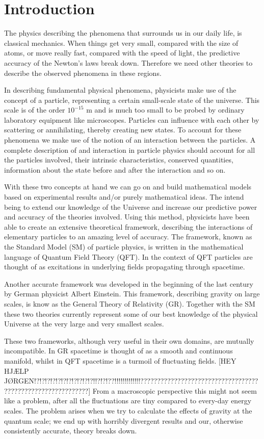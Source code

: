 \section{Introduction}
The physics describing the phenomena that surrounds us in our daily life, is classical mechanics. When things get very small, compared with the size of atoms, or move really fast, compared with the speed of light, the predictive accuracy of the Newton's laws break down. Therefore we need other theories to describe the observed phenomena in these regions.

In describing fundamental physical phenomena, physicists make use of the concept of a particle, representing a certain small-scale state of the universe. This scale is of the order $10^{-15}$ m and is much too small to be probed by ordinary laboratory equipment like microscopes. Particles can influence with each other by scattering or annihilating, thereby creating new states. To account for these phenomena we make use of the notion of an interaction between the particles. A complete description of and interaction in particle physics should account for all the particles involved, their intrinsic characteristics, conserved quantities, information about the state before and after the interaction and so on.

With these two concepts at hand we can go on and build mathematical models based on experimental results and/or purely mathematical ideas. The intend being to extend our knowledge of the Universe and increase our predictive power and accuracy of the theories involved. Using this method, physicists have been able to create an extensive theoretical framework, describing the interactions of elementary particles to an amazing level of accuracy. The framework, known as the Standard Model (SM) of particle physics, is written in the mathematical language of Quantum Field Theory (QFT). In the context of QFT particles are thought of as excitations in underlying fields propagating through spacetime.

Another accurate framework was developed in the beginning of the last century by German physicist Albert Einstein. This framework, describing gravity on large scales, is know as the General Theory of Relativity (GR). Together with the SM these two theories currently represent some of our best knowledge of the physical Universe at the very large and very smallest scales.

These two frameworks, although very useful in their own domains, are mutually incompatible. In GR spacetime is thought of as a smooth and continuous manifold, whilst in QFT spacetime is a turmoil of fluctuating fields. [HEY HJÆLP JØRGEN!?!?!?!?!?!?!?!?!?!?!?!!?!?!??!!!!!!!!!!!!!????????????????????????????????????????????????????????????] From a macroscopic perspective this might not seem like a problem, after all the fluctuations are tiny compared to every-day energy scales. The problem arises when we try to calculate the effects of gravity at the quantum scale; we end up with horribly divergent results and our, otherwise consistently accurate, theory breaks down.


